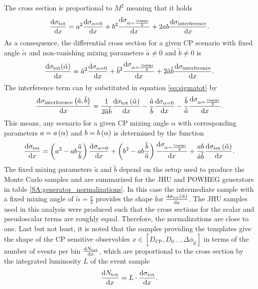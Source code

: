 The cross section is proportional to $M^2$ meaning that it holds 
\begin{equation}\label{eq:sigmatot}
    \diff{\sigma_\text{tot}}{x} =  a^2 \diff{\sigma_{\alpha=0}}{x} +  b^2\diff{\sigma_{\alpha=\frac{\pi}{2}}}{x} + 2ab\diff{\sigma_\text{interference}}{x}.
\end{equation}
As a consequence, the differential cross section for a given CP scenario with fixed angle $\tilde{\alpha}$ and non-vanishing mixing parameters $\tilde{a} \neq 0$ and $\tilde{b} \neq 0$ is 
\begin{equation}
    \diff{\sigma_\text{tot}(\tilde{\alpha})}{x} =  \tilde{a}^2 \diff{\sigma_{\alpha=0}}{x} +  \tilde{b}^2\diff{\sigma_{\alpha=\frac{\pi}{2}}}{x} + 2\tilde{a}\tilde{b}\diff{\sigma_\text{interference}}{x}.
\end{equation}
The interference term can by substituted in equation \eqref{eq:sigmatot} by 
\begin{equation}
    \diff{\sigma_\text{interference}\li \tilde{a}, \tilde{b} \re}{x} = \frac{1}{2\tilde{a}\tilde{b}}  \diff{\sigma_\text{tot}\li \tilde{\alpha} \re}{x} - \frac{\tilde{a}}{\tilde{b}} \diff{\sigma_{\alpha=0}}{x} -  \frac{\tilde{b}}{\tilde{a}} \diff{\sigma_{\alpha=\frac{\pi}{2}}}{x}.
\end{equation}
This means, any scenario for a given CP mixing angle $\alpha$ with corresponding parameters $a=a\left( \alpha \right)$ and $b=b\left( \alpha \right)$ is determined by the function
\begin{equation}\label{SA:total_yield}
    \diff{\sigma_\text{tot}}{x} =  \li a^2 - ab  \frac{\tilde{a}}{\tilde{b}} \re \diff{\sigma_{\alpha=0}}{x} +  \li b^2 - ab  \frac{\tilde{b}}{\tilde{a}} \re \diff{\sigma_{\alpha=\frac{\pi}{2}}}{x} + \frac{ab}{\tilde{a}\tilde{b}} \diff{\sigma_\text{tot}\li \tilde{\alpha} \re}{x}.
\end{equation}
The fixed mixing parameters $\tilde{a}$ and $\tilde{b}$ depend on the setup used to produce the Monte Carlo samples and are summarized for the JHU and POWHEG generators in table \ref{SA:generator_normalizations}.
In this case the intermediate sample with a fixed mixing angle of $\tilde{\alpha}=\frac{\pi}{4}$ provides the shape for  $\frac{\mathrm d \sigma_\text{tot}\left( \tilde{\alpha} \right)}{\mathrm d x}$.
The JHU samples used in this analysis were produced such that the cross sections for the scalar and pseudoscalar terms are roughly equal. Therefore, the normalizations are close to one.
Last but not least, it is noted that the samples providing the templates give the shape of the CP sensitive observables $x \in \left[ D_\text{CP}, D_{0-}, \Delta\phi_\text{jj}\right]$ in terms of the number of events per bin $\frac{\mathrm d N_\text{tot}}{\mathrm d x}$, which are proportional to the cross section by the integrated luminosity $L$ of the event sample
\begin{equation}
    \frac{\mathrm d N_\text{tot}}{\mathrm d x} = L\cdot \frac{\mathrm d \sigma_\text{tot}}{\mathrm d x}.
\end{equation}

